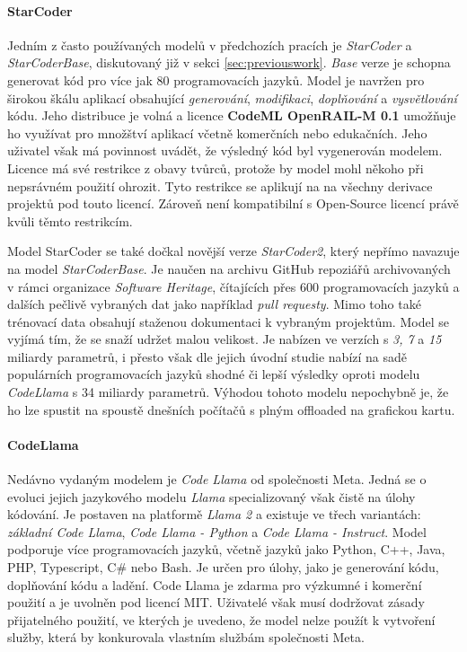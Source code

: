 \documentclass[czech, ma, kiv, he, iso690alph, pdf, viewonly]{fasthesis}
\begin{document}
    \paragraph{StarCoder} Jedním z často používaných modelů v předchozích pracích je \textit{StarCoder} a \textit{StarCoderBase}, diskutovaný již v sekci \ref{sec:previouswork}. \textit{Base} verze je schopna generovat kód pro více jak 80 programovacích jazyků. Model je navržen pro širokou škálu aplikací obsahující \textit{generování}, \textit{modifikaci}, \textit{doplňování} a \textit{vysvětlování} kódu. Jeho distribuce je volná a licence \textbf{CodeML OpenRAIL-M 0.1} \cite{BigCode2023} umožňuje ho využívat pro množštví aplikací včetně komerčních nebo edukačních. Jeho uživatel však má povinnost uvádět, že výsledný kód byl vygenerován modelem. Licence má své restrikce z obavy tvůrců, protože by model mohl někoho při nepsrávném použití ohrozit. Tyto restrikce se aplikují na na všechny derivace projektů pod touto licencí. Zároveň není kompatibilní s Open-Source licencí právě kvůli těmto restrikcím.

    Model StarCoder se také dočkal novější verze \textit{StarCoder2}, který nepřímo navazuje na model \textit{StarCoderBase}. Je naučen na archivu GitHub repoziářů archivovaných v rámci organizace \textit{Software Heritage}, čítajících přes 600 programovacích jazyků a dalších pečlivě vybraných dat jako například \textit{pull requesty}. Mimo toho také trénovací data obsahují staženou dokumentaci k vybraným projektům. Model se vyjímá tím, že se snaží udržet malou velikost. Je nabízen ve verzích s \textit{3, 7} a \textit{15} miliardy parametrů, i přesto však dle jejich úvodní studie \cite{lozhkov2024starcoder} nabízí na sadě populárních programovacích jazyků shodné či lepší výsledky oproti modelu \textit{CodeLlama} s 34 miliardy parametrů. Výhodou tohoto modelu nepochybně je, že ho lze spustit na spoustě dnešních počítačů s plným offloaded na grafickou kartu.

    \paragraph{CodeLlama} Nedávno vydaným modelem je \textit{Code Llama} od společnosti Meta. Jedná se o evoluci jejich jazykového modelu \textit{Llama} specializovaný však čistě na úlohy kódování. Je postaven na platformě \textit{Llama 2} a existuje ve třech variantách: \textit{základní Code Llama}, \textit{Code Llama - Python} a \textit{Code Llama - Instruct}. Model podporuje více programovacích jazyků, včetně jazyků jako Python, C++, Java, PHP, Typescript, C# nebo Bash. Je určen pro úlohy, jako je generování kódu, doplňování kódu a ladění. Code Llama je zdarma pro výzkumné i komerční použití a je uvolněn pod licencí MIT. Uživatelé však musí dodržovat  zásady přijatelného použití, ve kterých je uvedeno, že model nelze použít k vytvoření služby, která by konkurovala vlastním službám společnosti Meta. 
\end{document}
